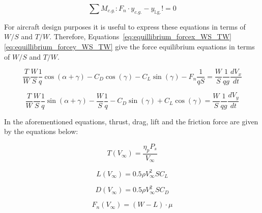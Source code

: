 \begin{equation}
    \label{eq:equillibrium_moment}
    \sum M_{c.g.}: F_n \cdot y_{c.g.}-y_\text{l.g.} != 0
\end{equation}

For aircraft design purposes it is useful to express these equations in terms of $W/S$ and $T/W$. Therefore, Equations~\eqref{eq:equillibrium_forcex_WS_TW}\textemdash\eqref{eq:equillibrium_forcey_WS_TW} give the force equilibrium equations in terms of $W/S$ and $T/W$.

\begin{equation}
    \label{eq:equillibrium_forcex_WS_TW}
    \frac{T}{W}\frac{W}{S}\frac{1}{q} \cos{(\alpha+\gamma)}-C_D\cos{(\gamma)}-C_L\sin{(\gamma)}-F_n \frac{1}{qS} = \frac{W}{S}\frac{1}{q g} \frac{dV_x}{dt}
\end{equation}

\begin{equation}
    \label{eq:equillibrium_forcey_WS_TW}
    \frac{T}{W}\frac{W}{S}\frac{1}{q} \sin{(\alpha+\gamma)}-\frac{W}{S}\frac{1}{q} - C_D\sin{(\gamma)}+C_L\cos{(\gamma)} = \frac{W}{S}\frac{1}{q g} \frac{dV_y}{dt}
\end{equation}

In the aforementioned equations, thrust, drag, lift and the friction force are given by the equations below:\newline

\noindent\begin{minipage}{.5\linewidth}
    \begin{equation}
        \label{eq:thrust}
        T(V_\infty) = \frac{\eta_p P_s}{V_\infty} 
    \end{equation}
\end{minipage}%
\begin{minipage}{.5\linewidth}
    \begin{equation}
        \label{eq:lift}
        L(V_\infty) = 0.5 \rho V_\infty^2 S C_{L}
    \end{equation}
\end{minipage}\newline
\noindent\begin{minipage}{.5\linewidth}
    \begin{equation}
        \label{eq:drag}
        D(V_\infty) = 0.5 \rho V_\infty^2 S C_{D}
    \end{equation}
\end{minipage}%
\begin{minipage}{.5\linewidth}
    \begin{equation}
        \label{eq:friction}
        F_n(V_\infty) = (W-L) \cdot \mu
    \end{equation}
\end{minipage}\newline


